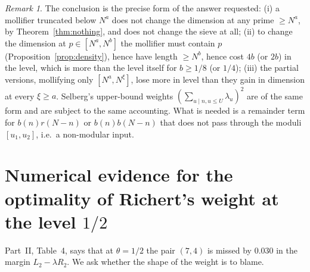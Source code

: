 \documentclass[11pt,a4paper]{article}
\theoremstyle{remark}
\newtheorem{remark}[theorem]{Remark}
\theoremstyle{definition}
\begin{document}
\begin{remark}
The conclusion is the precise form of the answer requested: (i) a mollifier truncated below $N^a$ does not change the dimension at any prime $\ge N^a$, by Theorem~\ref{thm:nothing}, and does not change the sieve at all; (ii) to change the dimension at $p\in[N^a,N^b]$ the mollifier must contain $p$ (Proposition~\ref{prop:density}), hence have length $\ge N^b$, hence cost $4b$ (or $2b$) in the level, which is more than the level itself for $b\ge1/8$ (or $1/4$); (iii) the partial versions, mollifying only $[N^a,N^\xi]$, lose more in level than they gain in dimension at every $\xi\ge a$. Selberg's upper-bound weights $(\sum_{u\mid n,u\le U}\lambda_u)^2$ are of the same form and are subject to the same accounting. What is needed is a remainder term for $b(n)r(N-n)$ or $b(n)b(N-n)$ that does not pass through the moduli $[u_1,u_2]$, i.e.\ a non-modular input.
\end{remark}

\section{Numerical evidence for the optimality of Richert's weight at the level $1/2$}

Part~II, Table~4, says that at $\theta=1/2$ the pair $(7,4)$ is missed by $0.030$ in the margin $L_2-\lambda R_2$. We ask whether the shape of the weight is to blame.
\end{document}
